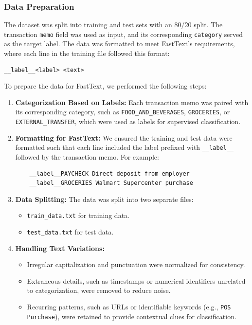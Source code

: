\documentclass[12pt,letterpaper]{article}
\begin{document}
\subsubsection{Data Preparation}
The dataset was split into training and test sets with an 80/20 split. The transaction \texttt{memo} field was used as input, and its corresponding \texttt{category} served as the target label. The data was formatted to meet FastText's requirements, where each line in the training file followed this format:

\begin{verbatim}
__label__<label> <text>
\end{verbatim}

To prepare the data for FastText, we performed the following steps:
\begin{enumerate}
    \item \textbf{Categorization Based on Labels:} Each transaction memo was paired with its corresponding category, such as \texttt{FOOD\_AND\_BEVERAGES}, \texttt{GROCERIES}, or \texttt{EXTERNAL\_TRANSFER}, which were used as labels for supervised classification.
    
    \item \textbf{Formatting for FastText:} We ensured the training and test data were formatted such that each line included the label prefixed with \texttt{\_\_label\_\_} followed by the transaction memo. For example:
    \begin{verbatim}
    __label__PAYCHECK Direct deposit from employer
    __label__GROCERIES Walmart Supercenter purchase
    \end{verbatim}
    
    \item \textbf{Data Splitting:} The data was split into two separate files:
    \begin{itemize}
        \item \texttt{train\_data.txt} for training data.
        \item \texttt{test\_data.txt} for test data.
    \end{itemize}
    
    \item \textbf{Handling Text Variations:}
    \begin{itemize}
        \item Irregular capitalization and punctuation were normalized for consistency.
        \item Extraneous details, such as timestamps or numerical identifiers unrelated to categorization, were removed to reduce noise.
        \item Recurring patterns, such as URLs or identifiable keywords (e.g., \texttt{POS Purchase}), were retained to provide contextual clues for classification.
    \end{itemize}
\end{enumerate}
\end{document}

